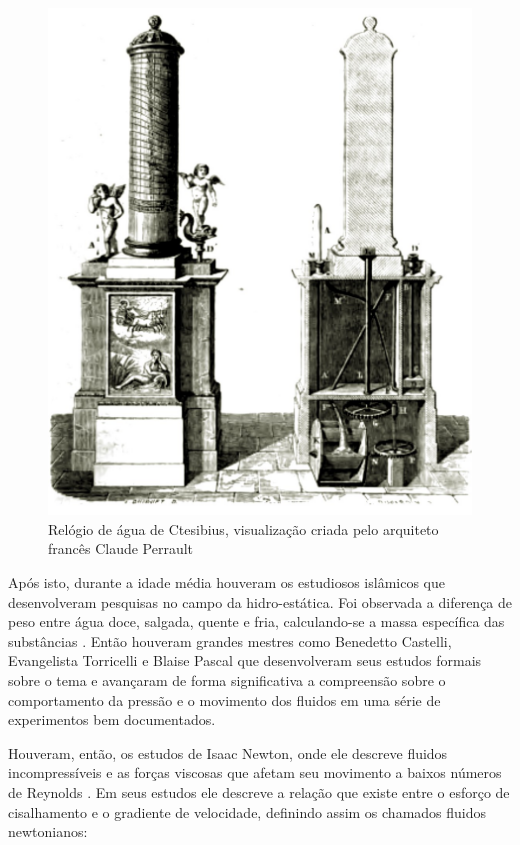 \begin{figure}[htb]
	\begin{center}
    \includegraphics[scale=0.07]{ctesibius.jpeg}
	\end{center}
	\caption{\label{image:ctesibius} Relógio de água de Ctesibius, visualização criada pelo arquiteto francês Claude Perrault}
\end{figure}

Após isto, durante a idade média houveram os estudiosos islâmicos que desenvolveram pesquisas no campo da hidro-estática. Foi observada a diferença de peso entre água doce, salgada, quente e fria, calculando-se a massa específica das substâncias \cite{history_engeneering}. Então houveram grandes mestres como Benedetto Castelli, Evangelista Torricelli e Blaise Pascal que desenvolveram seus estudos formais sobre o tema e avançaram de forma significativa a compreensão sobre o comportamento da pressão e o movimento dos fluidos em uma série de experimentos bem documentados.

Houveram, então, os estudos de Isaac Newton, onde ele descreve fluidos incompressíveis e as forças viscosas que afetam seu movimento a baixos números de Reynolds \cite{aristeu}. Em seus estudos ele descreve a relação que existe entre o esforço de cisalhamento e o gradiente de velocidade, definindo assim os chamados fluidos newtonianos:

